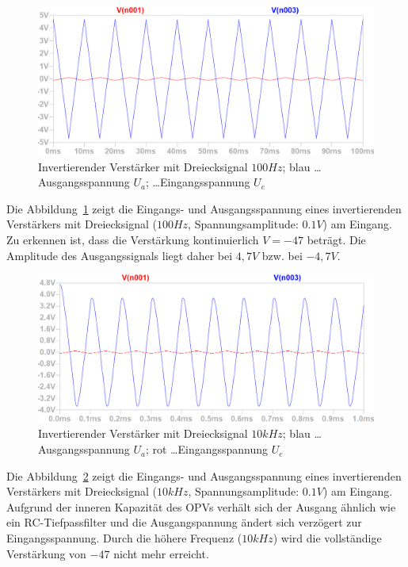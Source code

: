 \documentclass[12pt,a4paper,titlepage]{article}
\begin{document}
\begin{figure}[H]
  \centering
  \includegraphics[width=150mm]{invertierend_dreieck_eingangs_ausgangsspannung}
  \caption{Invertierender Verst\"arker mit Dreiecksignal $100Hz$; blau \dots Ausgangsspannung $U_a$; \dots Eingangsspannung $U_e$}
  \label{figure13}
\end{figure}
\noindent Die Abbildung~\ref{figure13} zeigt die Eingangs- und Ausgangsspannung eines invertierenden Verst\"arkers mit Dreiecksignal ($100Hz$, Spannungsamplitude: $0.1V$) am Eingang. Zu erkennen ist, dass die Verst\"arkung kontinuierlich $V = -47$ betr\"agt. Die Amplitude des Ausgangssignals liegt daher bei $4,7V$ bzw. bei $-4,7V$.

\begin{figure}[H]
  \centering
  \includegraphics[width=150mm]{invertierend_dreieck2_eingangs_ausgangsspannung}
  \caption{Invertierender Verst\"arker mit Dreiecksignal $10kHz$; blau \dots Ausgangsspannung $U_a$; rot \dots Eingangsspannung $U_e$}
  \label{figure14}
\end{figure}
\noindent Die Abbildung~\ref{figure14} zeigt die Eingangs- und Ausgangsspannung eines invertierenden Verst\"arkers mit Dreiecksignal ($10kHz$, Spannungsamplitude: $0.1V$) am Eingang. Aufgrund der inneren Kapazit\"at des OPVs verh\"alt sich der Ausgang \"ahnlich wie ein RC-Tiefpassfilter und die Ausgangspannung \"andert sich verz\"ogert zur Eingangsspannung. Durch die h\"ohere Frequenz ($10kHz$) wird die vollst\"andige Verst\"arkung von $-47$ nicht mehr erreicht.
\end{document}
